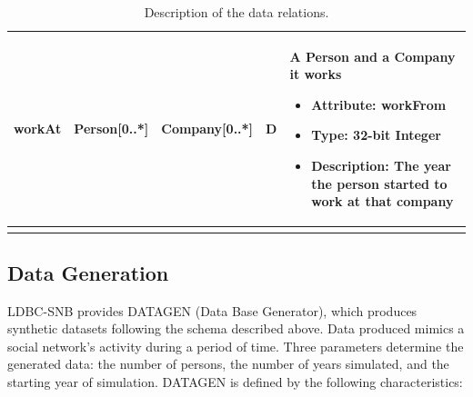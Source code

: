 \begin{longtable}{|p{2cm}|p{2.5cm}|p{2.5cm}|p{1cm}|p{7cm}|}
        \hline
        workAt & Person[0..*] & Company[0..*] & D & A Person and a Company it works
        \begin{itemize}
            \item \textbf{Attribute}: workFrom
            \item \textbf{Type:} 32-bit Integer
            \item \textbf{Description:} The year the person started to work at that company
        \end{itemize}
        \\
        \hline
        \caption{Description of the data relations.}
        \label{table:relations}
\end{longtable}

\subsection{Data Generation}\label{section:data_generation}

LDBC-SNB provides DATAGEN (Data Base Generator), which produces synthetic
datasets following the schema described above. Data
produced mimics a social network's activity during a period of time. Three
parameters determine the generated data: the number of persons, the number of
years simulated, and the starting year of simulation. DATAGEN is defined by the
following characteristics:


